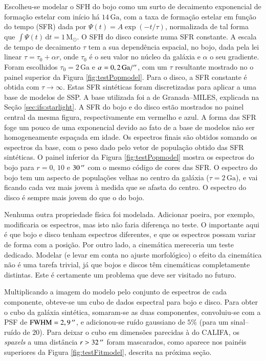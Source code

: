 Escolheu-se modelar o SFH do bojo como um surto de decaimento exponencial de
formação estelar com início há $14\,\mathrm{Ga}$, com a taxa de formação estelar
em função do tempo (SFR) dada por $\Psi(t) = A \exp (-t/\tau)$, normalizada de
tal forma que $\int \Psi(t)\,\mathrm{d}t = 1\,\mathrm{M}_\odot$. O SFH do disco
consiste numa SFR constante. A escala de tempo de decaimento $\tau$ tem a sua
dependência espacial, no bojo, dada pela lei linear $\tau = \tau_0 + \alpha r$,
onde $\tau_0$ é o seu valor no núcleo da galáxia e $\alpha$ o seu gradiente.
Foram escolhidos $\tau_0 = 2\,\mathrm{Ga}$ e $\alpha = 0,2\,\mathrm{Ga} /
^{\prime\prime}$, com um $\tau$ resultante mostrado no o painel superior da Figura
\ref{fig:testPopmodel}. Para o disco, a SFR constante é obtida com
$\tau\to\infty$. Estas SFR sintéticas foram discretizadas para aplicar a uma
base de modelos de SSP. A base utilizada foi a de Granada--MILES, explicada na
Seção \ref{sec:ifs:starlight}. A SFR do bojo e do disco estão mostrados no
painel central da mesma figura, respectivamente em vermelho e azul. A forma das
SFR foge um pouco de uma exponencial devido ao fato de a base de modelos não ser
homogeneamente espaçada em idade. Os espectros finais são obtidos somando os
espectros da base, com o peso dado pelo vetor de população obtido das SFR
sintéticas. O painel inferior da Figura \ref{fig:testPopmodel} mostra os
espectros do bojo para $r = 0$, $10$ e $30\,^{\prime\prime}$ com o mesmo código de cores
das SFR. O espectro do bojo tem um aspecto de populações velhas no centro da
galáxia ($\tau = 2\,\mathrm{Ga}$), e vai ficando cada vez mais jovem à medida
que se afasta do centro. O espectro do disco é sempre mais jovem do que o do
bojo.

Nenhuma outra propriedade física foi modelada. Adicionar poeira, por exemplo,
modificaria os espectros, mas isto não faria diferença no teste. O importante
aqui é que bojo e disco tenham espectros diferentes, e que os espectros possam
variar de forma com a posição. Por outro lado, a cinemática mereceria um teste
dedicado. Modelar (e levar em conta no ajuste morfológico) o efeito da
cinemática não é uma tarefa trivial, já que bojos e discos têm cinemáticas
completamente distintas. Este é certamente um problema que deve ser visitado no
futuro.

Multiplicando a imagem do modelo pelo conjunto de espectros de cada componente,
obteve-se um cubo de dados espectral para bojo e disco. Para obter o cubo da
galáxia sintética, somaram-se as duas componentes, convoluiu-se com a PSF de
$\mathrm{FWHM} = 2,9\,^{\prime\prime}$, e adicionou-se ruído gaussiano de $5\%$ (para um
sinal--ruído de $20$). Para deixar o cubo em dimensões parecidas à do CALIFA, os
{\em spaxels} a uma distância $r > 32\,^{\prime\prime}$ foram mascarados, como aparece nos
painéis superiores da Figura \ref{fig:testFitmodel}, descrita na próxima seção.

